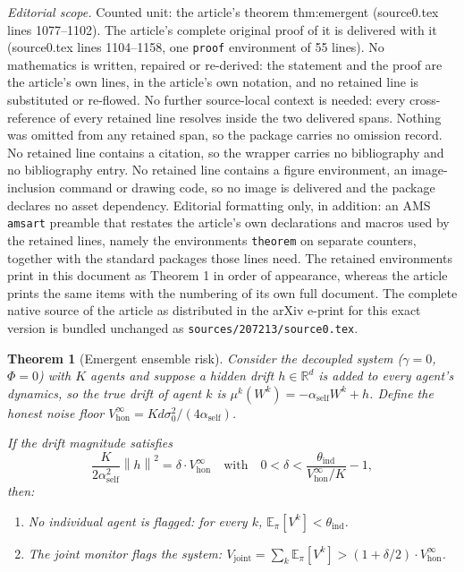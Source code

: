 \documentclass[10pt,a4paper]{amsart}
\newtheorem{theorem}{Theorem}
\newcommand{\E}{\mathbb{E}}
\newcommand{\R}{\mathbb{R}}
\newcommand{\norm}[1]{\left\lVert #1 \right\rVert}
\begin{document}
\noindent\textit{Editorial scope.} Counted unit: the article's theorem thm:emergent (source0.tex lines 1077--1102). The article's complete original proof of it is delivered with it (source0.tex lines 1104--1158, one \texttt{proof} environment of 55 lines). No mathematics is written, repaired or re-derived: the statement and the proof are the article's own lines, in the article's own notation, and no retained line is substituted or re-flowed.  No further source-local context is needed: every cross-reference of every retained line resolves inside the two delivered spans.  Nothing was omitted from any retained span, so the package carries no omission record.  No retained line contains a citation, so the wrapper carries no bibliography and no bibliography entry.  No retained line contains a figure environment, an image-inclusion command or drawing code, so no image is delivered and the package declares no asset dependency.  Editorial formatting only, in addition: an AMS \texttt{amsart} preamble that restates the article's own declarations and macros used by the retained lines, namely the environments \texttt{theorem} on separate counters, together with the standard packages those lines need.  The retained environments print in this document as Theorem 1 in order of appearance, whereas the article prints the same items with the numbering of its own full document.  The complete native source of the article as distributed in the arXiv e-print for this exact version is bundled unchanged as \texttt{sources/207213/source0.tex}.
\begin{theorem}[Emergent ensemble risk]
  \label{thm:emergent}
  Consider the decoupled system ($\gamma = 0$, $\Phi = 0$) with $K$ agents
  and suppose a hidden drift $h \in \R^d$ is added to every agent's
  dynamics, so the true drift of agent $k$ is
  $\mu^k(W^k) = -\alpha_{\mathrm{self}} W^k + h$.
  Define the honest noise floor
  $V^\infty_{\mathrm{hon}} = Kd\sigma_0^2/(4\alpha_{\mathrm{self}})$.

  If the drift magnitude satisfies
  \begin{equation}
    \frac{K}{2\alpha_{\mathrm{self}}^2}\norm{h}^2
    = \delta \cdot V^\infty_{\mathrm{hon}}
    \quad\text{with}\quad 0 < \delta < \frac{\theta_{\mathrm{ind}}}
    {V^\infty_{\mathrm{hon}} / K} - 1,
    \label{eq:h_condition}
  \end{equation}
  then:
  \begin{enumerate}[label=(\roman*)]
    \item No individual agent is flagged: for every $k$,
      $\E_\pi[V^k] < \theta_{\mathrm{ind}}$.
    \item The joint monitor flags the system:
      $V_{\mathrm{joint}} = \sum_k \E_\pi[V^k] >
      (1 + \delta/2) \cdot V^\infty_{\mathrm{hon}}$.
  \end{enumerate}
\end{theorem}
\end{document}
